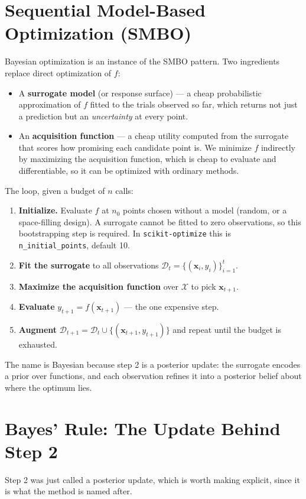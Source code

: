 \documentclass[conference]{IEEEtran}
\begin{document}
\section*{Sequential Model-Based Optimization (SMBO)}
Bayesian optimization is an instance of the SMBO pattern. Two ingredients replace direct optimization of $f$:
\begin{itemize}
    \item A \textbf{surrogate model} (or response surface) --- a cheap probabilistic approximation of $f$ fitted to the trials observed so far, which returns not just a prediction but an \textit{uncertainty} at every point.
    \item An \textbf{acquisition function} --- a cheap utility computed from the surrogate that scores how promising each candidate point is. We minimize $f$ indirectly by maximizing the acquisition function, which is cheap to evaluate and differentiable, so it can be optimized with ordinary methods.
\end{itemize}

The loop, given a budget of $n$ calls:
\begin{enumerate}
    \item \textbf{Initialize.} Evaluate $f$ at $n_0$ points chosen without a model (random, or a space-filling design). A surrogate cannot be fitted to zero observations, so this bootstrapping step is required. In \texttt{scikit-optimize} this is \texttt{n\_initial\_points}, default 10.
    \item \textbf{Fit the surrogate} to all observations $\mathcal{D}_t = \{(\mathbf{x}_i, y_i)\}_{i=1}^{t}$.
    \item \textbf{Maximize the acquisition function} over $\mathcal{X}$ to pick $\mathbf{x}_{t+1}$.
    \item \textbf{Evaluate} $y_{t+1} = f(\mathbf{x}_{t+1})$ --- the one expensive step.
    \item \textbf{Augment} $\mathcal{D}_{t+1} = \mathcal{D}_t \cup \{(\mathbf{x}_{t+1}, y_{t+1})\}$ and repeat until the budget is exhausted.
\end{enumerate}
The name is Bayesian because step 2 is a posterior update: the surrogate encodes a prior over functions, and each observation refines it into a posterior belief about where the optimum lies.

\section*{Bayes' Rule: The Update Behind Step 2}
Step 2 was just called a posterior update, which is worth making explicit, since it is what the method is named after.
\end{document}
